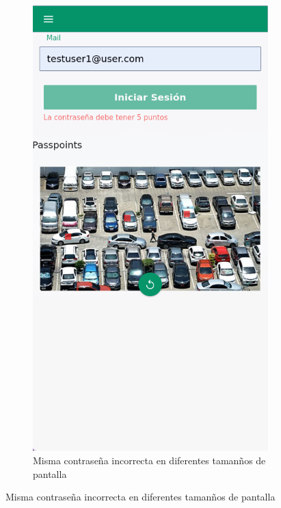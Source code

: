 \begin{anexos}
\begin{figure}
\begin{figure}[H]
\begin{minipage}[b]{0.68\linewidth}
		\end{minipage}%
		\hfill
		\begin{minipage}[b]{0.3\linewidth} %
			\centering
			\includegraphics[width=\linewidth]{Graphics/capturas/login-error-mobile.png}
			
		\end{minipage}
		\caption{Misma contrase\~na incorrecta en diferentes taman\~nos de pantalla }
		\label{error-scans}
	\end{figure}
\end{figure}




\end{anexos}
